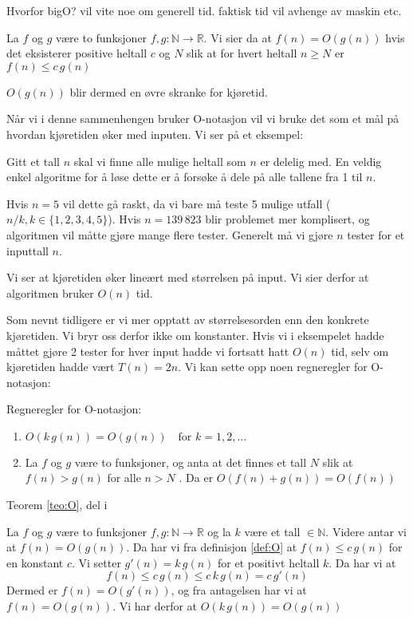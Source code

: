 Hvorfor bigO? vil vite noe om generell tid. faktisk tid vil avhenge av maskin etc. 

\begin{definisjon}
\label{def:O}
La $ f $ og $ g $ være to funksjoner $ f, g:\mathbb{N} \rightarrow \mathbb{R} $. Vi sier da at $ f(n) = O(g(n))$ hvis det eksisterer positive heltall $ c $ og $ N $ slik at for hvert heltall $ n\geq N $ er $ f(n) \leq c\,g(n) $
\end{definisjon}
$ O(g(n)) $ blir dermed en øvre skranke for kjøretid.

Når vi i denne sammenhengen bruker O-notasjon vil vi bruke det som et mål på hvordan kjøretiden øker med inputen. Vi ser på et eksempel:

\begin{eks}
Gitt et tall $ n $ skal vi finne alle mulige heltall som $ n $ er delelig med. En veldig enkel algoritme for å løse dette er å forsøke å dele på alle tallene fra 1 til $ n $. 

Hvis $ n=5 $ vil dette gå raskt, da vi bare må teste 5 mulige utfall ($ n/k, k \in \{1, 2, 3, 4, 5\} $). Hvis $ n=139\,823 $ blir problemet mer komplisert, og algoritmen vil måtte gjøre mange flere tester. Generelt må vi gjøre $ n $ tester for et inputtall $ n $.

Vi ser at kjøretiden øker lineært med størrelsen på input. Vi sier derfor at algoritmen bruker $ O(n) $ tid.
\end{eks}

Som nevnt tidligere er vi mer opptatt av størrelsesorden enn den konkrete kjøretiden. Vi bryr oss derfor ikke om konstanter. Hvis vi i eksempelet hadde måttet gjøre 2 tester for hver input hadde vi fortsatt hatt $ O(n) $ tid, selv om kjøretiden hadde vært $ T(n) = 2n $. Vi kan sette opp noen regneregler for O-notasjon:
\begin{teorem}
\label{teo:O}
Regneregler for O-notasjon:
\begin{enumerate}[i]
\item $ O(k\,g(n)) = O(g(n)) \quad \text{for } k = 1,2,... $
\item La $ f $ og $ g $ være to funksjoner, og anta at det finnes et tall $ N $ slik at $ f(n) > g(n) $ for alle $ n > N$ . Da er $ O(f(n)+g(n)) = O(f(n)) $
\end{enumerate}
\end{teorem}

\begin{bevis} Teorem \ref{teo:O}, del i

La $ f $ og $ g $ være to funksjoner $ f,g:\mathbb{N}\rightarrow\mathbb{R} $ og la $ k $ være et tall $ \in \mathbb{N} $. Videre antar vi at $ f(n) = O(g(n)) $. Da har vi fra definisjon \ref{def:O} at $ f(n) \leq c\,g(n) $ for en konstant $ c $. Vi setter $ g'(n) = k\,g(n) $ for et positivt heltall $ k $. Da har vi at
\[ f(n) \leq c\,g(n) \leq c\,k\,g(n) = c\,g'(n) \]
Dermed er $ f(n) = O(g'(n)) $, og fra antagelsen har vi at $ f(n) = O(g(n)) $. Vi har derfor at $ O(k\,g(n)) = O(g(n)) $
\end{bevis}

